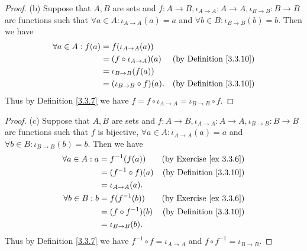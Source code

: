 \begin{proof}{(b)}
    Suppose that \(A, B\) are sets and \(f : A \to B, \iota_{A \to A} : A \to A, \iota_{B \to B} : B \to B\) are functions such that \(\forall a \in A : \iota_{A \to A}(a) = a\) and \(\forall b \in B : \iota_{B \to B}(b) = b\).
    Then we have
    \begin{align*}
        \forall a \in A : f(a) & = f(\iota_{A \to A}(a))                                               \\
                               & = (f \circ \iota_{A \to A})(a)  & \text{(by Definition \ref{3.3.10})} \\
                               & = \iota_{B \to B}(f(a))                                               \\
                               & = (\iota_{B \to B} \circ f)(a). & \text{(by Definition \ref{3.3.10})}
    \end{align*}
    Thus by Definition \ref{3.3.7} we have \(f = f \circ \iota_{A \to A} = \iota_{B \to B} \circ f\).
\end{proof}

\begin{proof}{(c)}
    Suppose that \(A, B\) are sets and \(f : A \to B, \iota_{A \to A} : A \to A, \iota_{B \to B} : B \to B\) are functions such that \(f\) is bijective, \(\forall a \in A : \iota_{A \to A}(a) = a\) and \(\forall b \in B : \iota_{B \to B}(b) = b\).
    Then we have
    \begin{align*}
        \forall a \in A : a & = f^{-1}(f(a))        & \text{(by Exercise \ref{ex 3.3.6})} \\
                            & = (f^{-1} \circ f)(a) & \text{(by Definition \ref{3.3.10})} \\
                            & = \iota_{A \to A}(a).                                       \\
        \forall b \in B : b & = f(f^{-1}(b))        & \text{(by Exercise \ref{ex 3.3.6})} \\
                            & = (f \circ f^{-1})(b) & \text{(by Definition \ref{3.3.10})} \\
                            & = \iota_{B \to B}(b).
    \end{align*}
    Thus by Definition \ref{3.3.7} we have \(f^{-1} \circ f = \iota_{A \to A}\) and \(f \circ f^{-1} = \iota_{B \to B}\).
\end{proof}

